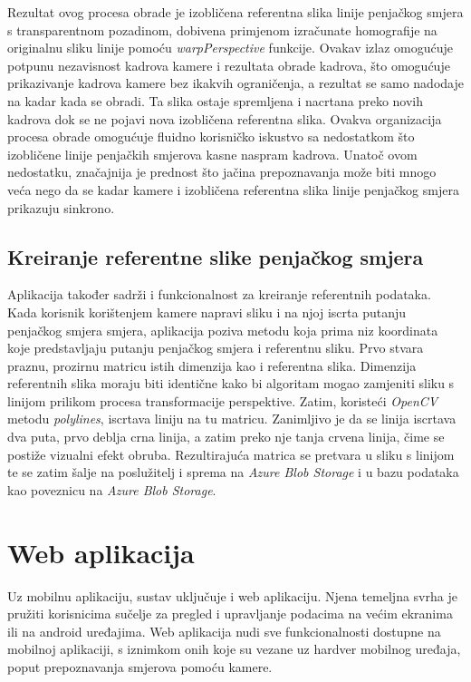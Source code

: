 Rezultat ovog procesa obrade je izobličena referentna slika linije penjačkog smjera s transparentnom pozadinom, dobivena primjenom izračunate homografije na originalnu sliku linije pomoću \textit{warpPerspective} funkcije. Ovakav izlaz omogućuje potpunu nezavisnost kadrova kamere i rezultata obrade kadrova, što omogućuje prikazivanje kadrova kamere bez ikakvih ograničenja, a rezultat se samo nadodaje na kadar kada se obradi. 
Ta slika ostaje spremljena i nacrtana preko novih kadrova dok se ne pojavi nova izobličena referentna slika. Ovakva organizacija procesa obrade omogućuje fluidno korisničko iskustvo sa nedostatkom što izobličene linije penjačkih smjerova kasne naspram kadrova. Unatoč ovom nedostatku, značajnija je prednost što jačina prepoznavanja može biti mnogo veća nego da se kadar kamere i izobličena referentna slika linije penjačkog smjera prikazuju sinkrono.

\subsection{Kreiranje referentne slike penjačkog smjera}

Aplikacija također sadrži i funkcionalnost za kreiranje referentnih podataka. Kada korisnik korištenjem kamere napravi sliku i na njoj iscrta putanju penjačkog smjera smjera, aplikacija poziva metodu koja prima niz koordinata koje predstavljaju putanju penjačkog smjera i referentnu sliku. Prvo stvara praznu, prozirnu matricu istih dimenzija kao i referentna slika. Dimenzija referentnih slika moraju biti identične kako bi algoritam mogao zamjeniti sliku s linijom prilikom procesa transformacije perspektive. Zatim, koristeći \textit{OpenCV} metodu \textit{polylines}, iscrtava liniju na tu matricu. Zanimljivo je da se linija iscrtava dva puta, prvo deblja crna linija, a zatim preko nje tanja crvena linija, čime se postiže vizualni efekt obruba. Rezultirajuća matrica se pretvara u sliku s linijom te se zatim šalje na poslužitelj i sprema na \textit{Azure Blob Storage} i u bazu podataka kao poveznicu na \textit{Azure Blob Storage}.


\section{Web aplikacija}

Uz mobilnu aplikaciju, sustav uključuje i web aplikaciju. Njena temeljna svrha je pružiti korisnicima sučelje za pregled i upravljanje podacima na većim ekranima ili na android uređajima. Web aplikacija nudi sve funkcionalnosti dostupne na mobilnoj aplikaciji, s iznimkom onih koje su vezane uz hardver mobilnog uređaja, poput prepoznavanja smjerova pomoću kamere.


